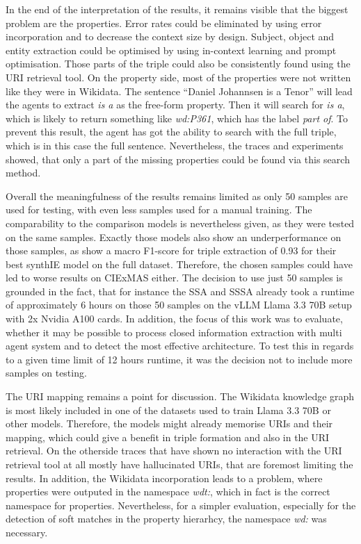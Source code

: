 \documentclass[a4paper,oneside,bibliography=totoc]{scrbook}
\begin{document}
In the end of the interpretation of the results, it remains visible that the biggest problem are the properties. Error rates could be eliminated by using error incorporation and to decrease the context size by design. Subject, object and entity extraction could be optimised by using in-context learning and prompt optimisation. Those parts of the triple could also be consistently found using the URI retrieval tool. On the property side, most of the properties were not written like they were in Wikidata. The sentence \enquote{Daniel Johannsen is a Tenor} will lead the agents to extract \textit{is a} as the free-form property. Then it will search for \textit{is a}, which is likely to return something like \textit{wd:P361}, which has the label \textit{part of}. To prevent this result, the agent has got the ability to search with the full triple, which is in this case the full sentence. Nevertheless, the traces and experiments showed, that only a part of the missing properties could be found via this search method.

Overall the meaningfulness of the results remains limited as only 50 samples are used for testing, with even less samples used for a manual training. The comparability to the comparison models is nevertheless given, as they were tested on the same samples. Exactly those models also show an underperformance on those samples, as \citet{Josifoski2023} show a macro F1-score for triple extraction of 0.93 for their best synthIE model on the full dataset. Therefore, the chosen samples could have led to worse results on CIExMAS either. The decision to use just 50 samples is grounded in the fact, that for instance the \ac{SSA} and \ac{SSSA} already took a runtime of approximately 6 hours on those 50 samples on the vLLM Llama 3.3 70B setup with 2x Nvidia A100 cards. In addition, the focus of this work was to evaluate, whether it may be possible to process closed information extraction with multi agent system and to detect the most effective architecture. To test this in regards to a given time limit of 12 hours runtime, it was the decision not to include more samples on testing.

The URI mapping remains a point for discussion. The Wikidata knowledge graph is most likely included in one of the datasets used to train Llama 3.3 70B or other models. Therefore, the models might already memorise URIs and their mapping, which could give a benefit in triple formation and also in the URI retrieval. On the otherside traces that have shown no interaction with the URI retrieval tool at all mostly have hallucinated URIs, that are foremost limiting the results. In addition, the Wikidata incorporation leads to a problem, where properties were outputed in the namespace \textit{wdt:}, which in fact is the correct namespace for properties. Nevertheless, for a simpler evaluation, especially for the detection of soft matches in the property hierarhcy, the namespace \textit{wd:} was necessary.
\end{document}

